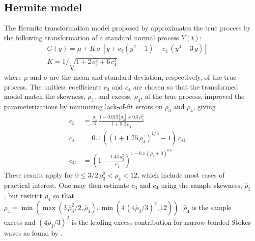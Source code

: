 \subsection{Hermite model}
The Hermite transformation model proposed by
\cite{Winterstein1985Nonnormal}
approximates the true process by the following transformation of a
standard normal process $Y(t)$:
\begin{gather}
  G(y) = \mu + K \,\sigma \,[ y + c_{3}(y^2-1) + c_{4} \,(y^3-3\,y)] \\
     K  = 1/\sqrt{1+2\,c_{3}^2+6\,c_{4}^2}
\end{gather}
where $\mu$ and $\sigma$ are the mean and standard deviation,
respectively,  of the true process. The unitless coefficients $c_{3}$ and
$c_{4}$ are chosen so that the transformed model
match the skewness, $\rho_{3}$, and excess,
$\rho_{4}$, of the true process.
\cite{WintersteinEtal1994Springing} improved the parameterizations by
minimizing lack-of-fit errors on $\rho_{3}$ and $\rho_{4}$, giving
\begin{align}
     c_{3}  &= \frac{\rho_{3}}{6} \,
\frac{1-0.015\,|\rho_{3}|+ 0.3\, \rho_{3}^2}{1+0.2\,\rho_{4}} \\
     c_{4}  &= 0.1\,\left( \left( 1+1.25\,\rho_{4} \right)^{1/3}-1 \right)\,c_{41}                 \\
     c_{41} &= \left(1-\frac{1.43\,\rho_{3}^2}{\rho_{4}} \right)^{1-0.1\,(\rho_{4}+3)^{0.8}}
\end{align}
These results apply for $0\le 3/2\,\rho_{3}^{2}<\rho_{4}<12$,
which include most cases
of practical interest.
One may then estimate $c_{3}$ and $c_{4}$ using the sample
skewness, $\hat{\rho}_{3}$, but restrict $\rho_{4}$ so that
$\rho_{4} =
\min(\max(3\,\hat{\rho}_{3}^{2}/2,\hat{\rho}_{4}),\min(4\,(4\hat{\rho}_{3}/3)^{2},12))$.
$\hat{\rho}_{4}$ is the sample excess and
$(4\hat{\rho}_{3}/3)^{2}$ is the leading excess
contribution for narrow banded Stokes waves as found by
\cite{MarthinsenAndWinterstein1992Skewness}.


